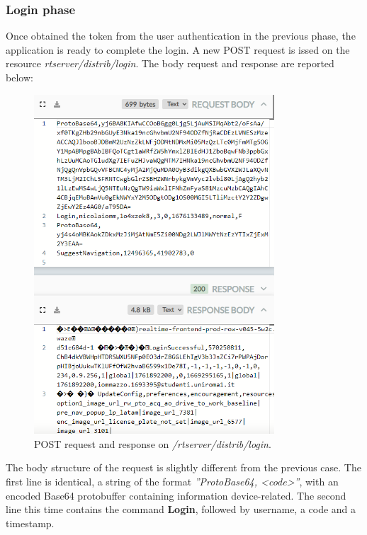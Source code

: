 		\subsubsection{Login phase}
			\par Once obtained the token from the user authentication in the previous phase, the application is ready to complete the login. A new POST request is issed on the resource \textit{rtserver/distrib/login}. The body request and response are reported below:
			\begin{figure}[H]
				\centering
				\includegraphics[width=0.8\textwidth]{images/waze_loginbody.png}
				\caption{POST request and response on \textit{/rtserver/distrib/login}.}
			\end{figure}
			\par The body structure of the request is slightly different from the previous case. \newline
			The first line is identical, a string of the format \textit{''ProtoBase64, <code>''}, with an encoded Base64 protobuffer containing information device-related. \newline
			The second line this time contains the command \textbf{Login}, followed by username, a code and a timestamp.\newline
